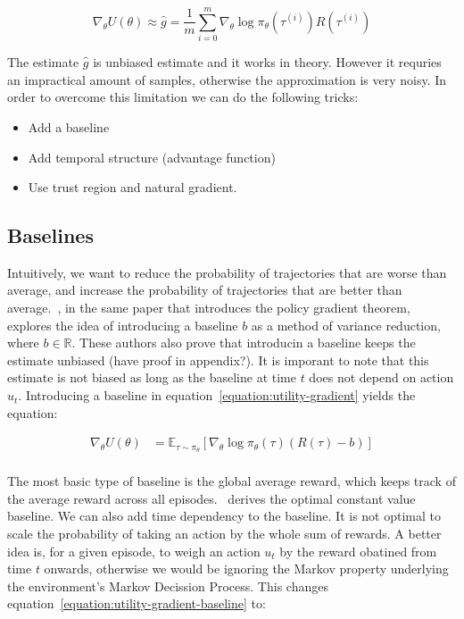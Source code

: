 \documentclass{../main.tex}{subfiles}
\begin{document}
\begin{equation}\label{equation:expectance-gradient-vanilla}
\nabla_{\theta}U(\theta) \approx \hat{g} = \frac{1}{m} \sum_{i = 0}^{m} \nabla_{\theta} \log \pi_{\theta}(\tau^{(i)}) R(\tau^{(i)})
\end{equation}

The estimate $\hat{g}$ is unbiased estimate and it works in theory. However it requries an impractical amount of samples, otherwise the approximation is very noisy. In order to overcome this limitation we can do the following tricks:

\begin{itemize}
\item Add a baseline
\item Add temporal structure (advantage function)
\item Use trust region and natural gradient.
\end{itemize}

\subsection{Baselines}
Intuitively, we want to reduce the probability of trajectories that are worse than average, and increase the probability of trajectories that are better than average.~\cite{Williams1992}, in the same paper that introduces the policy gradient theorem, explores the idea of introducing a baseline $b$ as a method of variance reduction, where $b \in \mathbb{R}$. These authors also prove that introducin a baseline keeps the estimate unbiased (have proof in appendix?). It is imporant to note that this estimate is not biased as long as the baseline at time $t$ does not depend on action $u_t$. Introducing a baseline in equation~\ref{equation:utility-gradient} yields the equation:

\begin{equation}\label{equation:utility-gradient-baseline}
\begin{aligned}
\nabla_{\theta} U(\theta) & = \mathbb{E}_{\tau \sim \pi_{\theta}} [\nabla_{\theta} \log \pi_{\theta}(\tau) (R(\tau) - b)] \\
\end{aligned}
\end{equation}

The most basic type of baseline is the global average reward, which keeps track of the average reward across all episodes.~\cite{Greensmith2004} derives the optimal constant value baseline. We can also add time dependency to the baseline. It is not optimal to scale the probability of taking an action by the whole sum of rewards. A better idea is, for a given episode, to weigh an action $u_t$ by the reward obatined from time $t$ onwards, otherwise we would be ignoring the Markov property underlying the environment's Markov Decission Process. This changes equation~\ref{equation:utility-gradient-baseline} to:
\end{document}
